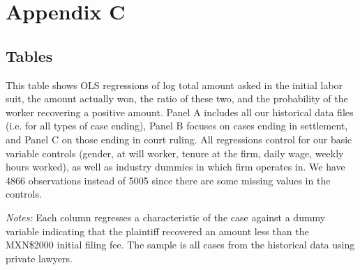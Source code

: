 
\newpage
\section*{Appendix C}
\label{appendix_c}

\setcounter{table}{0}
\renewcommand{\thetable}{C.\arabic{table}} 
\setcounter{figure}{0}
\renewcommand{\thefigure}{C.\arabic{figure}} 

\subsection{Tables}

\begin{table}[!ht]
    \caption{Amount asked (log), amount won (log), and probability of winning - Historic Data}
    \label{Table_Reg_winnings_log}
    \begin{center}

        \scriptsize{}
    \end{center}
    \scriptsize
   This table shows OLS regressions of log total amount asked in the initial labor suit, the amount actually won, the ratio of these two, and the probability of the worker recovering a positive amount. Panel A includes all our historical data files (i.e. for all types of case ending), Panel B focuses on cases ending in settlement, and Panel C on those ending in court ruling. All regressions control for our basic variable controls (gender, at will worker, tenure at the firm, daily wage, weekly hours worked), as well as industry dummies in which firm operates in. We have 4866 observations instead of 5005 since there are some missing values in the controls.
\end{table}


\begin{table}[!ht]
    \caption{Balance of casefiles having negative recovery amount.}
    \label{negative_returners}
    \begin{center}
    \scriptsize{}
    \end{center}
     \scriptsize
    \textit{Notes:} Each column regresses a characteristic of the case against a dummy variable indicating that the plaintiff recovered an amount less than the MXN\$2000 initial filing fee. The sample is all cases from the historical data using private lawyers.  
         
\end{table}


